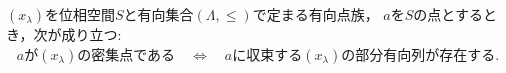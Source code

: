 	\begin{screen}
		\begin{thm}[有向点族の密集点に対する部分収束点族の存在]
			$(x_\lambda)$を位相空間$S$と有向集合$(\Lambda,\leq)$で定まる有向点族，
			$a$を$S$の点とするとき，次が成り立つ:
			\begin{align}
				\mbox{$a$が$(x_\lambda)$の密集点である}
				\quad \Longleftrightarrow \quad
				\mbox{$a$に収束する$(x_\lambda)$の部分有向列が存在する}.
			\end{align}
		\end{thm}
	\end{screen}